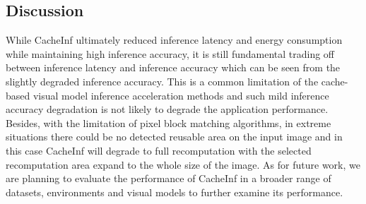 


\subsection{Discussion}
While CacheInf ultimately reduced inference latency and energy consumption while maintaining high inference accuracy, it is still fundamental trading off between inference latency and inference accuracy which can be seen from the slightly degraded inference accuracy.
This is a common limitation of the cache-based visual model inference acceleration methods and such mild inference accuracy degradation is not likely to degrade the application performance.
Besides, with the limitation of pixel block matching algorithms, in extreme situations there could be no detected reusable area on the input image and in this case CacheInf will degrade to full recomputation with the selected recomputation area expand to the whole size of the image.
As for future work, we are planning to evaluate the performance of CacheInf in a broader range of datasets, environments and visual models to further examine its performance.